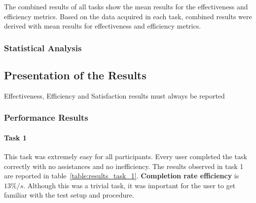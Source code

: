 \documentclass[a4paper]{article}
\begin{document}
  The combined results of all tasks show the mean results for the effectiveness and efficiency metrics.
  Based on the data acquired in each task, combined results were derived with mean results for effectiveness and efficiency metrics.
  
\subsubsection{Statistical Analysis}
   
\subsection{Presentation of the Results}
   Effectiveness, Efficiency and Satisfaction results must always be reported

\subsubsection{Performance Results}
 
 \paragraph{Task 1} This task was extremely easy for all participants. Every user completed the task correctly with no assistances and no inefficiency. The results observed in task 1 are reported in table~\ref{table:results_task_1}. \textbf{Completion rate efficiency} is $13\%/s$. Although this was a trivial task, it was important for the user to get familiar with the test setup and procedure.
 
\end{document}
